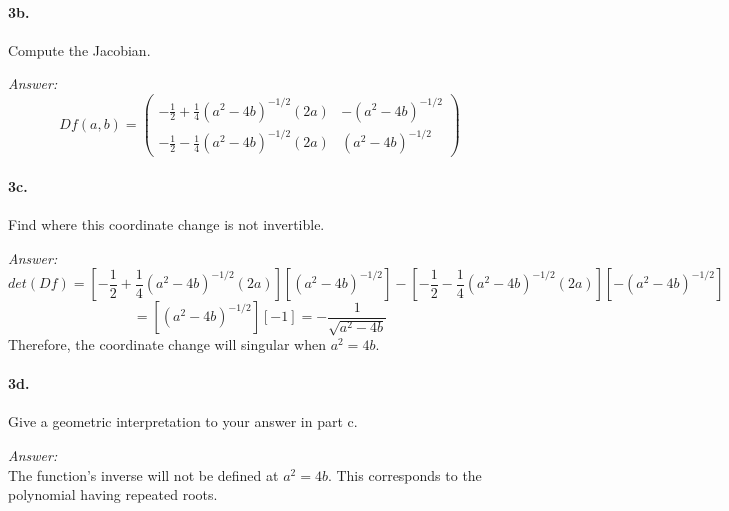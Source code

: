 \documentclass[10pt,a4paper]{article}
\begin{document}
\paragraph{3b.} Compute the Jacobian.
\begin{flushleft}
\textit{Answer:}\\
$$Df(a,b) = 
\begin{pmatrix}
-\frac{1}{2}+\frac{1}{4}(a^2-4b)^{-1/2}(2a) & -(a^2-4b)^{-1/2}\\
-\frac{1}{2}-\frac{1}{4}(a^2-4b)^{-1/2}(2a) & (a^2-4b)^{-1/2}
\end{pmatrix}$$
\end{flushleft}

\paragraph{3c.} Find where this coordinate change is not invertible.
\begin{flushleft}
\textit{Answer:}\\
$$ det(Df) = \left[ -\frac{1}{2}+\frac{1}{4}(a^2-4b)^{-1/2}(2a) \right]\left[ (a^2-4b)^{-1/2}\right] - \left[ -\frac{1}{2}-\frac{1}{4}(a^2-4b)^{-1/2}(2a)\right]\left[ -(a^2-4b)^{-1/2}\right]$$
$$  = \left[ (a^2-4b)^{-1/2}\right]\left[ -1\right] = -\frac{1}{\sqrt{a^2-4b}}$$
Therefore, the coordinate change will singular when $a^2 = 4b$.
\end{flushleft}

\paragraph{3d.} Give a geometric interpretation to your answer in part c.
\begin{flushleft}
\textit{Answer:}\\
The function's inverse will not be defined at $a^2 = 4b$. This corresponds to the polynomial having repeated roots.
\end{flushleft}
\end{document}
